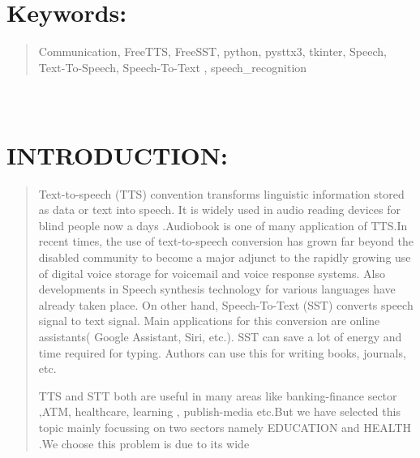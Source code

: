 \documentclass[]{article}
\begin{document}
\section{Keywords:}\label{keywords}

\begin{quote}
Communication, FreeTTS, FreeSST, python, pysttx3, tkinter, Speech,
Text-To-Speech, Speech-To-Text , speech\_recognition
\end{quote}

\section{\texorpdfstring{\\
INTRODUCTION:}{ INTRODUCTION:}}\label{introduction}

\begin{quote}
Text-to-speech (TTS) convention transforms linguistic information stored
as data or text into speech. It is widely used in audio reading devices
for blind people now a days .Audiobook is one of many application of
TTS.In recent times, the use of text-to-speech conversion has grown far
beyond the disabled community to become a major adjunct to the rapidly
growing use of digital voice storage for voicemail and voice response
systems. Also developments in Speech synthesis technology for various
languages have already taken place. On other hand, Speech-To-Text (SST)
converts speech signal to text signal. Main applications for this
conversion are online assistants( Google Assistant, Siri, etc.). SST can
save a lot of energy and time required for typing. Authors can use this
for writing books, journals, etc.

TTS and STT both are useful in many areas like banking-ﬁnance sector
,ATM, healthcare, learning , publish-media etc.But we have selected this
topic mainly focussing on two sectors namely EDUCATION and HEALTH .We
choose this problem is due to its wide


\end{quote}
\end{document}
